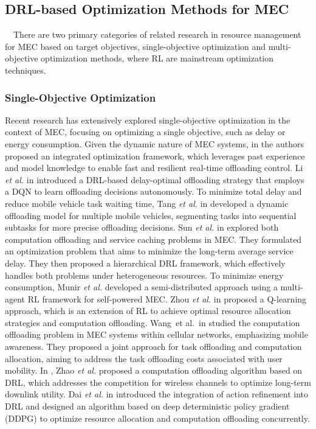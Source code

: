 \documentclass[12pt,draftclsnofoot,onecolumn]{IEEEtran}
\newenvironment{my}[2]%
{\begin{list}{}%
{\setlength{\rightmargin}{#1}\setlength{\leftmargin}{#2}}%


 \item[]{}

} {\end{list}}
\begin{document}
\begin{enumerate}
\begin{my}{1cm}{1cm}
{		\subsection{DRL-based Optimization Methods for MEC} 
		
		\,\,\,\,
		There are two primary categories of related research in resource management for MEC based on target objectives, single-objective optimization and multi-objective optimization methods, where RL are mainstream optimization techniques.\vspace{3mm}
		\subsubsection{Single-Objective Optimization} 
		Recent research has extensively explored single-objective optimization in the context of MEC, focusing on optimizing a single objective, such as delay or energy consumption. 
		Given the dynamic nature of MEC systems, in \cite{li2022integrated} the authors proposed an integrated optimization framework, which leverages past experience and model knowledge to enable fast and resilient real-time offloading control. 
		Li \textit{et al.} in \cite{li2020joint} introduced a DRL-based delay-optimal offloading strategy that employs a DQN to learn offloading decisions autonomously. 
		To minimize total delay and reduce mobile vehicle task waiting time, Tang \textit{et al.} in \cite{tang2022double} developed a dynamic offloading model for multiple mobile vehicles, segmenting tasks into sequential subtasks for more precise offloading decisions.
		Sun \textit{et al.} in \cite{sun2024hierarchical} explored both computation offloading and service caching problems in MEC. They formulated an optimization problem that aims to minimize the long-term average service delay. They then proposed a hierarchical DRL framework, which effectively handles both problems under heterogeneous resources.
		To minimize energy consumption, Munir \textit{et al.} \cite{munir2021multi} developed a semi-distributed approach using a multi-agent RL framework for self-powered MEC. 
		Zhou \textit{et al.} in \cite{zhou2021deep} proposed a Q-learning approach, which is an extension of RL to achieve optimal resource allocation strategies and computation offloading.
		Wang et al. in \cite{wang2020reinforcement} studied the computation offloading problem in MEC systems within cellular networks, emphasizing mobile awareness. They proposed a joint approach for task offloading and computation allocation, aiming to address the task offloading costs associated with user mobility. 
		In \cite{zhao2019deep}, Zhao \textit{et al.} proposed a computation offloading algorithm based on DRL, which addresses the competition for wireless channels to optimize long-term downlink utility.
		Dai \textit{et al.} in \cite{dai2020edge} introduced the integration of action refinement into DRL and designed an algorithm based on deep deterministic policy gradient (DDPG) to optimize resource allocation and computation offloading concurrently.\vspace{3mm}
		
}
\end{my}
\end{enumerate}
\end{document}
